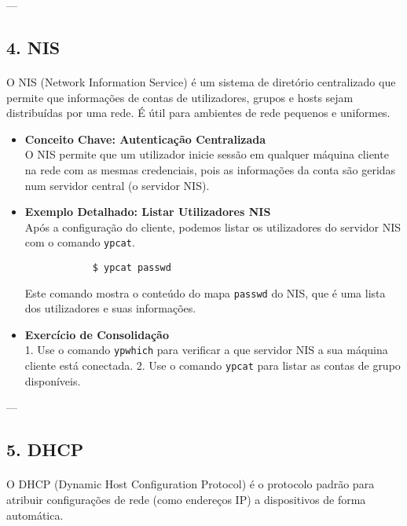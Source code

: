 \documentclass[10pt,a4paper]{article}
\begin{document}
	---
	
	\subsection*{4. NIS}
	\vspace{-1.2em}
	\paragraph{}
	O NIS (Network Information Service) é um sistema de diretório centralizado que permite que informações de contas de utilizadores, grupos e hosts sejam distribuídas por uma rede. É útil para ambientes de rede pequenos e uniformes.
	
	\begin{itemize}
		\item \textbf{Conceito Chave: Autenticação Centralizada} \\
		O NIS permite que um utilizador inicie sessão em qualquer máquina cliente na rede com as mesmas credenciais, pois as informações da conta são geridas num servidor central (o servidor NIS).
		
		\item \textbf{Exemplo Detalhado: Listar Utilizadores NIS} \\
		Após a configuração do cliente, podemos listar os utilizadores do servidor NIS com o comando \texttt{ypcat}.
		\begin{verbatim}
			$ ypcat passwd
		\end{verbatim}
		Este comando mostra o conteúdo do mapa \texttt{passwd} do NIS, que é uma lista dos utilizadores e suas informações.
		
		\item \textbf{Exercício de Consolidação} \\
		1. Use o comando \texttt{ypwhich} para verificar a que servidor NIS a sua máquina cliente está conectada.
		2. Use o comando \texttt{ypcat} para listar as contas de grupo disponíveis.
	\end{itemize}
	
	---
	
	\subsection*{5. DHCP}
	\vspace{-1.2em}
	\paragraph{}
	O DHCP (Dynamic Host Configuration Protocol) é o protocolo padrão para atribuir configurações de rede (como endereços IP) a dispositivos de forma automática.
	
\end{document}
